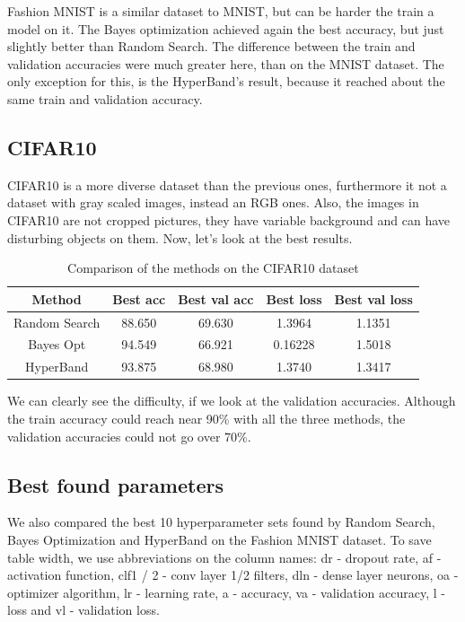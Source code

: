 \documentclass[conference]{IEEEtran}
\begin{document}
Fashion MNIST is a similar dataset to MNIST, but can be harder the train a model on it. The Bayes optimization achieved again the best accuracy, but just slightly better than Random Search. The difference between the train and validation accuracies were much greater here, than on the MNIST dataset. The only exception for this, is the HyperBand's result, because it reached about the same train and validation accuracy.

\subsection{CIFAR10}
CIFAR10 is a more diverse dataset than the previous ones, furthermore it not a dataset with gray scaled images, instead an RGB ones. Also, the images in CIFAR10 are not cropped pictures, they have variable background and can have disturbing objects on them. Now, let's look at the best results.
\begin{table}[htbp]
	\footnotesize
	\renewcommand{\arraystretch}{1.0} %
\begin{center}
\begin{tabular}{|c|c|c|c|c|} \hline
	Method & Best acc & Best val acc & Best loss & Best val loss \\ \hline
	Random Search & 88.650 & 69.630 & 1.3964 & 1.1351 \\ \hline
	Bayes Opt & 94.549 & 66.921 & 0.16228 & 1.5018 \\ \hline
	HyperBand & 93.875 & 68.980 & 1.3740 & 1.3417 \\ \hline
	\end{tabular}
	\label{tab:results_cifar}
\end{center}
	\caption{Comparison of the methods on the CIFAR10 dataset}
\end{table}\vspace{-0.3cm}

We can clearly see the difficulty, if we look at the validation accuracies. Although the train accuracy could reach near 90\% with all the three methods, the validation accuracies could not go over 70\%.

\subsection{Best found parameters}
We also compared the best 10 hyperparameter sets found by Random Search, Bayes Optimization and HyperBand on the Fashion MNIST dataset. To save table width, we use abbreviations on the column names: dr - dropout rate, af - activation function, clf1 / 2 - conv layer 1/2 filters, dln - dense layer neurons, oa - optimizer algorithm, lr - learning rate, a - accuracy, va - validation accuracy, l - loss and vl - validation loss.
\clearpage

\vspace{-0.5cm}
\end{document}
